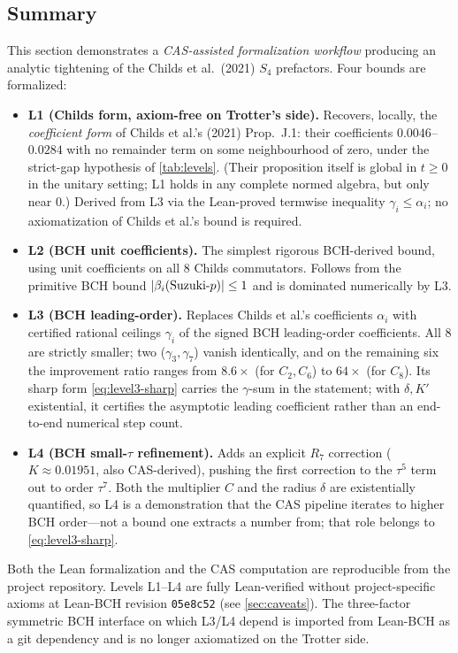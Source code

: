 \subsection{Summary}

This section demonstrates a \emph{CAS-assisted formalization workflow}
producing an analytic tightening of the Childs et al.\ (2021) $S_4$
prefactors. Four bounds are formalized:

\begin{itemize}[leftmargin=*, nosep]
  \item \textbf{L1 (Childs form, axiom-free on Trotter's side).}
    Recovers, locally, the \emph{coefficient form} of Childs et al.'s
    (2021) Prop.~J.1: their coefficients $0.0046$--$0.0284$ with no
    remainder term on some neighbourhood of zero, under the strict-gap
    hypothesis of \cref{tab:levels}. (Their proposition itself is global in
    $t \ge 0$ in the unitary setting; L1 holds in any complete normed
    algebra, but only near $0$.) Derived from L3 via the
    Lean-proved termwise inequality $\gamma_i \le \alpha_i$;
    no axiomatization of Childs et al.'s bound is required.
  \item \textbf{L2 (BCH unit coefficients).} The simplest rigorous
    BCH-derived bound, using unit coefficients on all 8 Childs commutators.
    Follows from the primitive BCH bound $\left|\beta_i(\text{Suzuki-}p)\right| \le 1$
    and is dominated numerically by L3.
  \item \textbf{L3 (BCH leading-order).} Replaces Childs et al.'s
    coefficients $\alpha_i$ with certified rational ceilings $\gamma_i$ of
    the signed BCH leading-order coefficients. All 8 are strictly smaller; two ($\gamma_3,
    \gamma_7$) vanish identically, and on the remaining six the improvement
    ratio ranges from $8.6\times$ (for $C_2, C_6$) to $64\times$ (for $C_8$).
    Its sharp form \cref{eq:level3-sharp} carries the $\gamma$-sum in the
    statement; with $\delta, K'$ existential, it certifies the asymptotic
    leading coefficient rather than an end-to-end numerical step count.
  \item \textbf{L4 (BCH small-$\tau$ refinement).} Adds an explicit $R_7$
    correction ($K \approx 0.01951$, also CAS-derived), pushing the first
    correction to the $\tau^5$ term out to order $\tau^7$. Both the
    multiplier $C$ and the radius $\delta$ are existentially quantified, so
    L4 is a demonstration that the CAS pipeline iterates to higher BCH
    order---not a bound one extracts a number from; that role belongs to
    \cref{eq:level3-sharp}.
\end{itemize}

Both the Lean formalization and the CAS computation are reproducible from
the project repository. Levels L1--L4 are fully Lean-verified without
project-specific axioms at Lean-BCH revision \texttt{05e8c52} (see
\cref{sec:caveats}). The three-factor symmetric BCH interface on which
L3/L4 depend is imported from Lean-BCH as a git dependency and is no
longer axiomatized on the Trotter side.
